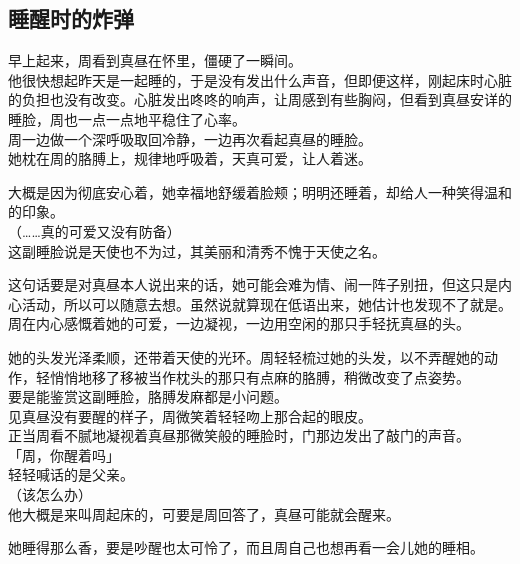 \subsection{睡醒时的炸弹}

早上起来，周看到真昼在怀里，僵硬了一瞬间。\\

他很快想起昨天是一起睡的，于是没有发出什么声音，但即便这样，刚起床时心脏的负担也没有改变。心脏发出咚咚的响声，让周感到有些胸闷，但看到真昼安详的睡脸，周也一点一点地平稳住了心率。\\

周一边做一个深呼吸取回冷静，一边再次看起真昼的睡脸。\\

她枕在周的胳膊上，规律地呼吸着，天真可爱，让人着迷。

大概是因为彻底安心着，她幸福地舒缓着脸颊；明明还睡着，却给人一种笑得温和的印象。\\

（……真的可爱又没有防备）\\

这副睡脸说是天使也不为过，其美丽和清秀不愧于天使之名。

这句话要是对真昼本人说出来的话，她可能会难为情、闹一阵子别扭，但这只是内心活动，所以可以随意去想。虽然说就算现在低语出来，她估计也发现不了就是。\\

周在内心感慨着她的可爱，一边凝视，一边用空闲的那只手轻抚真昼的头。

她的头发光泽柔顺，还带着天使的光环。周轻轻梳过她的头发，以不弄醒她的动作，轻悄悄地移了移被当作枕头的那只有点麻的胳膊，稍微改变了点姿势。\\

要是能鉴赏这副睡脸，胳膊发麻都是小问题。\\

见真昼没有要醒的样子，周微笑着轻轻吻上那合起的眼皮。\\

正当周看不腻地凝视着真昼那微笑般的睡脸时，门那边发出了敲门的声音。\\

「周，你醒着吗」\\

轻轻喊话的是父亲。\\

（该怎么办）\\

他大概是来叫周起床的，可要是周回答了，真昼可能就会醒来。

她睡得那么香，要是吵醒也太可怜了，而且周自己也想再看一会儿她的睡相。\\


